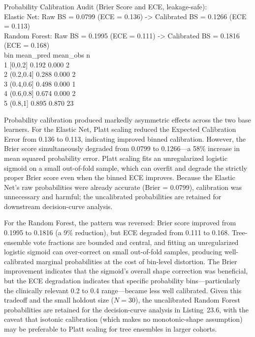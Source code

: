 \documentclass[11pt,oneside]{book}
\begin{document}
\begin{routput}
Probability Calibration Audit (Brier Score and ECE, leakage-safe):\\
\hspace*{2em}Elastic Net:   Raw BS = 0.0799 (ECE = 0.136) -> Calibrated BS = 0.1266 (ECE = 0.113)\\
\hspace*{2em}Random Forest: Raw BS = 0.1995 (ECE = 0.111) -> Calibrated BS = 0.1816 (ECE = 0.168)\\
\hspace*{1em}bin       mean\_pred mean\_obs     n\\
1 [0,0.2]       0.192    0.000     2\\
2 (0.2,0.4]     0.288    0.000     2\\
3 (0.4,0.6]     0.498    0.000     1\\
4 (0.6,0.8]     0.674    0.000     2\\
5 (0.8,1]       0.895    0.870    23
\end{routput}

Probability calibration produced markedly asymmetric effects across the two base learners. For the Elastic Net, Platt scaling reduced the Expected Calibration Error from 0.136 to 0.113, indicating improved binned calibration. However, the Brier score simultaneously degraded from 0.0799 to 0.1266---a 58\% increase in mean squared probability error. Platt scaling fits an unregularized logistic sigmoid on a small out-of-fold sample, which can overfit and degrade the strictly proper Brier score even when the binned ECE improves. Because the Elastic Net's raw probabilities were already accurate (Brier = 0.0799), calibration was unnecessary and harmful; the uncalibrated probabilities are retained for downstream decision-curve analysis.

For the Random Forest, the pattern was reversed: Brier score improved from 0.1995 to 0.1816 (a 9\% reduction), but ECE degraded from 0.111 to 0.168. Tree-ensemble vote fractions are bounded and central, and fitting an unregularized logistic sigmoid can over-correct on small out-of-fold samples, producing well-calibrated marginal probabilities at the cost of bin-level distortion. The Brier improvement indicates that the sigmoid's overall shape correction was beneficial, but the ECE degradation indicates that specific probability bins---particularly the clinically relevant 0.2 to 0.4 range---became less well calibrated. Given this tradeoff and the small holdout size ($N = 30$), the uncalibrated Random Forest probabilities are retained for the decision-curve analysis in Listing~23.6, with the caveat that isotonic calibration (which makes no monotonic-shape assumption) may be preferable to Platt scaling for tree ensembles in larger cohorts.
\end{document}
